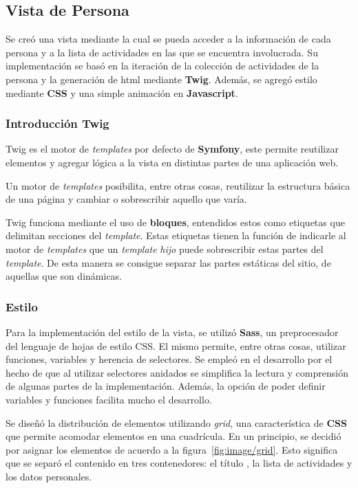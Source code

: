 

\subsection{Vista de Persona}
\label{sub:vista_persona}
Se creó una vista mediante la cual se pueda acceder a la información de cada persona y a la lista de actividades en las que se encuentra involucrada. Su
implementación se basó en la iteración de la colección de actividades  de la persona y la generación de html mediante \textbf{Twig}\@. Además,
se agregó estilo mediante \textbf{CSS} y una simple animación en \textbf{Javascript}.

\subsubsection{Introducción Twig}%
\label{ssub:introducción_twig}

Twig es el motor de \textit{templates} por defecto de \textbf{Symfony}, este permite reutilizar elementos y agregar lógica a la vista en distintas partes de una aplicación web\@.


Un motor de \textit{templates} posibilita, entre otras cosas, reutilizar la estructura básica de una página y cambiar o sobrescribir aquello que varía.

Twig funciona mediante el uso de \textbf{bloques}, entendidos estos como etiquetas que delimitan secciones del \textit{template}\@. Estas etiquetas tienen la función de indicarle al
motor de \textit{templates} que un \textit{template} \textit{hijo} puede sobrescribir estas partes del \textit{template}\@. De esta manera se consigue separar las partes estáticas
del sitio, de aquellas que son dinámicas.

\subsubsection{Estilo}%
\label{ssub:estilo}

Para la implementación del estilo de la vista, se utilizó \textbf{Sass}, un preprocesador del lenguaje de hojas de estilo CSS. El mismo permite, entre otras cosas, utilizar
funciones, variables y herencia de selectores. Se empleó en el desarrollo por el hecho de que al utilizar selectores anidados se simplifica
la lectura y comprensión de algunas partes de la implementación. Además, la opción de poder definir variables y funciones facilita mucho el desarrollo.


Se diseñó la distribución de elementos utilizando \textit{grid}, una característica de \textbf{CSS} que permite acomodar elementos en una cuadrícula\@.
En un principio, se decidió por asignar los elementos de acuerdo a la figura~\ref{fig:image/grid}. Esto significa que se separó el contenido en tres contenedores: el título
, la lista de actividades y los datos personales.

